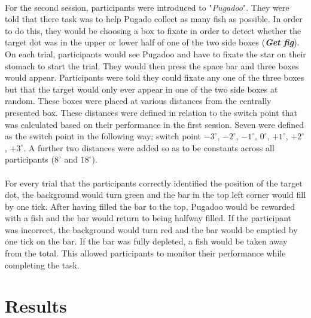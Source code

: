 \documentclass[12pt]{article}
\begin{document}
\paragraph{} For the second session, participants were introduced to "\textit{Pugadoo}". They were told that there task was to help Pugado collect as many fish as possible. In order to do this, they would be choosing a box to fixate in order to detect whether the target dot was in the upper or lower half of one of the two side boxes (\textit{\textbf{Get fig}}). On each trial, participants would see Pugadoo and have to fixate the star on their stomach to start the trial. They would then press the space bar and three boxes would appear. Participants were told they could fixate any one of the three boxes but that the target would only ever appear in one of the two side boxes at random. These boxes were placed at various distances from the centrally presented box. These distances were defined in relation to the switch point that was calculated based on their performance in the first session. Seven were defined as the switch point in the following way; switch point $-3^{\circ}$, $-2^{\circ}$, $-1^{\circ}$, $0^{\circ}$, $+1^{\circ}$, $+2^{\circ}$, $+3^{\circ}$. A further two distances were added so as to be constants across all participants ($8^{\circ}$ and $18^{\circ}$). 

\paragraph{} For every trial that the participants correctly identified the position of the target dot, the background would turn green and the bar in the top left corner would fill by one tick. After having filled the bar to the top, Pugadoo would be rewarded with a fish and the bar would return to being halfway filled. If the participant was incorrect, the background would turn red and the bar would be emptied by one tick on the bar. If the bar was fully depleted, a fish would be taken away from the total. This allowed participants to monitor their performance while completing the task. 

\paragraph{}

\section*{Results}
\end{document}
